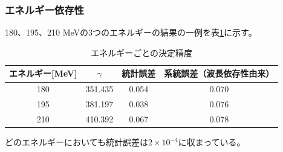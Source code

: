 \documentclass[a4paper,11pt,uplatex]{jsbook}
\begin{document}
\subsubsection{エネルギー依存性}
180、195、210 MeVの3つのエネルギーの結果の一例を表\ref{energy_dep}に示す。
\begin{table}[H]
  \centering
\begin{tabular}{c|ccc}
  エネルギー[MeV] & $\gamma$ & 統計誤差 & 系統誤差（波長依存性由来）\\
  \hline
  180 & 351.435 & 0.054  & 0.070\\
  195 & 381.197 & 0.038 & 0.076\\
  210 & 410.392 & 0.067  & 0.078\\
\end{tabular}\caption{エネルギーごとの決定精度}\label{energy_dep}
\end{table}
どのエネルギーにおいても統計誤差は$2\times10^{-4}$に収まっている。
\end{document}
